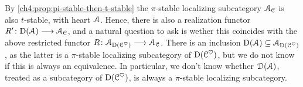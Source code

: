 \begin{remark}
    By \cref{ch4:prop:pi-stable-then-t-stable} the $\pi$-stable localizing subcategory $\EuScript{A}_{\EuScript{C}}$ is also $t$-stable, with heart $\EuScript{A}$. Hence, there is also a realization functor $R'\colon \mathrm{D}(\EuScript{A})\longrightarrow \EuScript{A}_{\EuScript{C}}$, and a natural question to ask is wether this coincides with the above restricted functor $R\colon \EuScript{A}_{\mathrm{D}(\EuScript{C}^\heartsuit)}\longrightarrow \EuScript{A}_{\EuScript{C}}$. There is an inclusion $\mathrm{D}(\EuScript{A})\subseteq \EuScript{A}_{\mathrm{D}(\EuScript{C}^\heartsuit)}$, as the latter is a $\pi$-stable localizing subcategory of $\mathrm{D}(\EuScript{C}^\heartsuit)$, but we do not know if this is always an equivalence. In particular, we don't know whether $\EuScript{D}(\EuScript{A})$, treated as a subcategory of $\mathrm{D}(\EuScript{C}^\heartsuit)$, is always a $\pi$-stable localizing subcategory. 
\end{remark}














